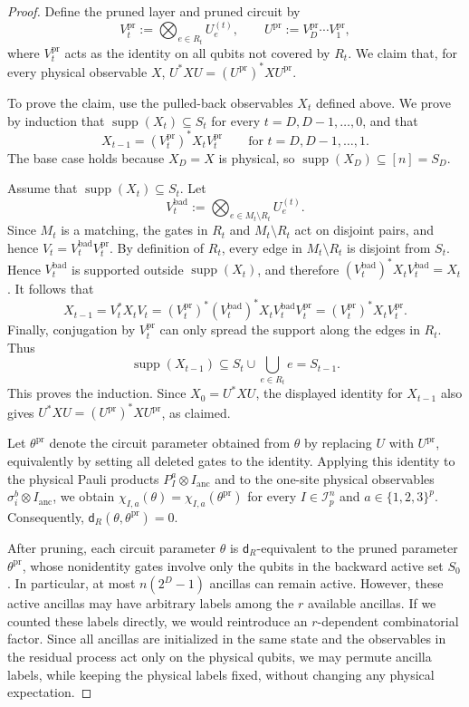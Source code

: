 \documentclass[12pt]{article}
\newcommand{\mcI}{\mathcal{I}}
\begin{document}
\begin{proof}
Define the pruned layer and pruned circuit by
\[
    V_t^{\mathrm{pr}}
    :=
    \bigotimes_{e\in R_t}U_e^{(t)},
    \qquad 
    U^{\mathrm{pr}}
    :=
    V_D^{\mathrm{pr}}\cdots V_1^{\mathrm{pr}},
\]
where \(V_t^{\mathrm{pr}}\) acts as the identity on all qubits not covered by
\(R_t\). We claim that, for every physical observable \(X\), $U^*XU=(U^{\mathrm{pr}})^*XU^{\mathrm{pr}}$.

To prove the claim, use the pulled-back observables \(X_t\) defined above. We prove by induction that \(\operatorname{supp}(X_t)\subseteq S_t\) for every
\(t=D,D-1,\dots,0\), and that
\[
    X_{t-1}=(V_t^{\mathrm{pr}})^*X_tV_t^{\mathrm{pr}}
    \qquad\text{for }t=D,D-1,\dots,1.
\]
The base case holds because \(X_D=X\) is physical, so
\(\operatorname{supp}(X_D)\subseteq[n]=S_D\).

Assume that \(\operatorname{supp}(X_t)\subseteq S_t\). Let
\[
    V_t^{\mathrm{bad}}
    :=
    \bigotimes_{e\in M_t\setminus R_t}U_e^{(t)}.
\]
Since \(M_t\) is a matching, the gates in \(R_t\) and \(M_t\setminus R_t\)
act on disjoint pairs, and hence $V_t=V_t^{\mathrm{bad}}V_t^{\mathrm{pr}}$. By definition of \(R_t\), every edge in \(M_t\setminus R_t\) is disjoint from
\(S_t\). Hence \(V_t^{\mathrm{bad}}\) is supported outside
\(\operatorname{supp}(X_t)\), and therefore $(V_t^{\mathrm{bad}})^*X_tV_t^{\mathrm{bad}}=X_t$. It follows that
\[
    X_{t-1}
    =
    V_t^*X_tV_t
    =
    (V_t^{\mathrm{pr}})^*
    (V_t^{\mathrm{bad}})^*
    X_t
    V_t^{\mathrm{bad}}
    V_t^{\mathrm{pr}}
    =
    (V_t^{\mathrm{pr}})^*X_tV_t^{\mathrm{pr}} .
\]
Finally, conjugation by \(V_t^{\mathrm{pr}}\) can only spread the support along
the edges in \(R_t\). Thus
\[
    \operatorname{supp}(X_{t-1})
    \subseteq
    S_t\cup\bigcup_{e\in R_t}e
    =
    S_{t-1}.
\]
This proves the induction. Since \(X_0=U^*XU\), the displayed identity for
\(X_{t-1}\) also gives $U^*XU=(U^{\mathrm{pr}})^*XU^{\mathrm{pr}}$, as claimed.

Let \(\theta^{\mathrm{pr}}\) denote the circuit parameter obtained from
\(\theta\) by replacing \(U\) with \(U^{\mathrm{pr}}\), equivalently by setting
all deleted gates to the identity. Applying this identity to the physical
Pauli products \(P_I^a\otimes I_{\mathrm{anc}}\) and to the one-site physical
observables \(\sigma_i^b\otimes I_{\mathrm{anc}}\), we obtain $\chi_{I,a}(\theta)=\chi_{I,a}(\theta^{\mathrm{pr}})$ for every \(I\in\mcI_p^n\) and \(a\in\{1,2,3\}^p\). Consequently, $\mathsf d_R(\theta,\theta^{\mathrm{pr}})=0$.

After pruning, each circuit parameter \(\theta\) is \(\mathsf d_R\)-equivalent
to the pruned parameter \(\theta^{\mathrm{pr}}\), whose nonidentity gates
involve only the qubits in the backward active set \(S_0\). In particular, at
most \(n(2^D-1)\) ancillas can remain active. However, these active ancillas
may have arbitrary labels among the \(r\) available ancillas. If we counted
these labels directly, we would reintroduce an \(r\)-dependent combinatorial
factor. Since all ancillas are initialized in the same state and the observables
in the residual process act only on the physical qubits, we may permute ancilla
labels, while keeping the physical labels fixed, without changing any physical
expectation.


\end{proof}
\end{document}
